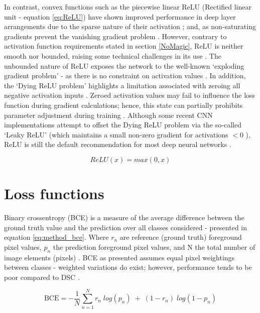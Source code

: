 In contrast, convex functions such as the piecewise linear ReLU (Rectified
linear unit - equation \ref{eq:ReLU}) have shown improved performance in deep
layer arrangements due to the sparse nature of their activation
\cite{Krizhevsky2012}; and, as non-saturating gradients prevent the vanishing
gradient problem \cite{Lundervold2019}. However, contrary to activation function
requirements stated in section \ref{NoMagic}, ReLU is neither smooth nor
bounded, raising some technical challenges in its use \cite{Lundervold2019}. The
unbounded nature of ReLU exposes the network to the well-known `exploding
gradient problem' - as there is no constraint on activation values
\cite{xu2015}. In addition, the `Dying ReLU problem' highlights a limitation
associated with zeroing all negative activation inputs \cite{xu2015}. Zeroed
activation values may fail to influence the loss function during gradient
calculations; hence, this state can partially prohibits parameter adjustment
during training \cite{xu2015}. Although some recent CNN implementations attempt
to offset the Dying ReLU problem via the so-called `Leaky ReLU' (which maintains
a small non-zero gradient for activations $< 0$ \cite{Maas2013}), ReLU is still
the default recommendation for most deep neural networks \cite{Goodfellow2016}.

\begin{equation}
ReLU(x) = max(0,x)
\label{eq:ReLU}
\end{equation}


\section{Loss functions}

Binary crossentropy (BCE) is a measure of the average difference between the
ground truth value and the prediction over all classes considered
\cite{taghanaki2018} - presented in equation \ref{eq:method_bce}. Where $r_{n}$
are reference (ground truth) foreground pixel values, $p_{n}$ the prediction
foreground pixel values, and N the total number of image elements (pixels)
\cite{Sudre_2017}. BCE as presented assumes equal pixel weightings between
classes \cite{Sudre_2017} - weighted variations do exist; however, performance
tends to be poor compared to DSC \cite{Bertels2019}.

\begin{equation}
\textrm{BCE} = -\frac{1}{N}\sum_{n=1}^{N}r_{n} \; log(p_{n}) \; + \; (1-r_{n}) \; log(1-p_{n})
\label{eq:method_bce}
\end{equation}

